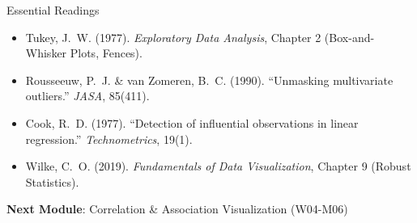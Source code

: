 \documentclass[10pt]{beamer}
\begin{document}
\begin{frame}{Essential Readings}
  \begin{itemize}
    \item Tukey, J.~W. (1977). \emph{Exploratory Data Analysis},
          Chapter 2 (Box-and-Whisker Plots, Fences).
    \item Rousseeuw, P.~J. \& van Zomeren, B.~C. (1990). ``Unmasking
          multivariate outliers.'' \emph{JASA}, 85(411).
    \item Cook, R.~D. (1977). ``Detection of influential observations
          in linear regression.'' \emph{Technometrics}, 19(1).
    \item Wilke, C.~O. (2019). \emph{Fundamentals of Data Visualization},
          Chapter 9 (Robust Statistics).
  \end{itemize}
  \vspace{6pt}
  \textbf{Next Module}: Correlation \& Association Visualization (W04-M06)
\end{frame}
\end{document}
